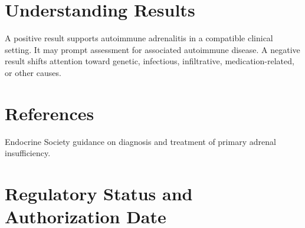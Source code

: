 \section*{Understanding Results}
A positive result supports autoimmune adrenalitis in a compatible clinical setting. It may prompt assessment for associated autoimmune disease. A negative result shifts attention toward genetic, infectious, infiltrative, medication-related, or other causes.

\section*{References}
Endocrine Society guidance on diagnosis and treatment of primary adrenal insufficiency.

\clearpage


\section*{Regulatory Status and Authorization Date}

\clearpage
